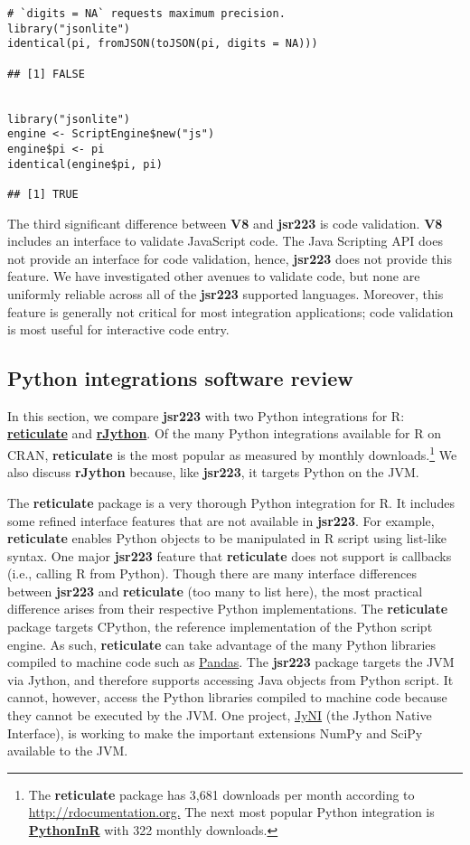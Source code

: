 \documentclass[
article,
11pt, %
a4paper, %
oneside, %
headinclude,footinclude, %
]{scrartcl}
\theoremstyle{definition} %
\theoremstyle{plain} %
\theoremstyle{remark} %
\newcommand{\pkg}[1]{\textbf{#1}}
\newcommand{\CRANpkg}[1]{\href{https://CRAN.R-project.org/package=#1}{\pkg{#1}}}
\begin{document}
\begin{verbatim}
# `digits = NA` requests maximum precision.
library("jsonlite")
identical(pi, fromJSON(toJSON(pi, digits = NA)))

## [1] FALSE


library("jsonlite")
engine <- ScriptEngine$new("js")
engine$pi <- pi
identical(engine$pi, pi)

## [1] TRUE
\end{verbatim}

The third significant difference between \pkg{V8} and \pkg{jsr223} is code validation. \pkg{V8} includes an interface to validate JavaScript code. The Java Scripting API does not provide an interface for code validation, hence, \pkg{jsr223} does not provide this feature. We have investigated other avenues to validate code, but none are uniformly reliable across all of the \pkg{jsr223} supported languages. Moreover, this feature is generally not critical for most integration applications; code validation is most useful for interactive code entry.

\hypertarget{python-integrations}{}
\subsection{Python integrations software review}

In this section, we compare \pkg{jsr223} with two Python integrations for R: \CRANpkg{reticulate} and \CRANpkg{rJython}. Of the many Python integrations available for R on CRAN, \pkg{reticulate} is the most popular as measured by monthly downloads.\footnote{The \pkg{reticulate} package has 3,681 downloads per month according to \href{http://rdocumentation.org}{http://rdocumentation.org.} The next most popular Python integration is \CRANpkg{PythonInR} with 322 monthly downloads.} We also discuss \pkg{rJython} because, like \pkg{jsr223}, it targets Python on the JVM.

The \pkg{reticulate} package is a very thorough Python integration for R. It includes some refined interface features that are not available in \pkg{jsr223}. For example, \pkg{reticulate} enables Python objects to be manipulated in R script using list-like syntax. One major \pkg{jsr223} feature that \pkg{reticulate} does not support is callbacks (i.e., calling R from Python). Though there are many interface differences between \pkg{jsr223} and \pkg{reticulate} (too many to list here), the most practical difference arises from their respective Python implementations. The \pkg{reticulate} package targets CPython, the reference implementation of the Python script engine. As such, \pkg{reticulate} can take advantage of the many Python libraries compiled to machine code such as \href{https://pandas.pydata.org/}{Pandas}. The \pkg{jsr223} package targets the JVM via Jython, and therefore supports accessing Java objects from Python script. It cannot, however, access the Python libraries compiled to machine code because they cannot be executed by the JVM. One project, \href{http://www.jyni.org/}{JyNI} (the Jython Native Interface), is working to make the important extensions NumPy and SciPy available to the JVM. %
\end{document}
